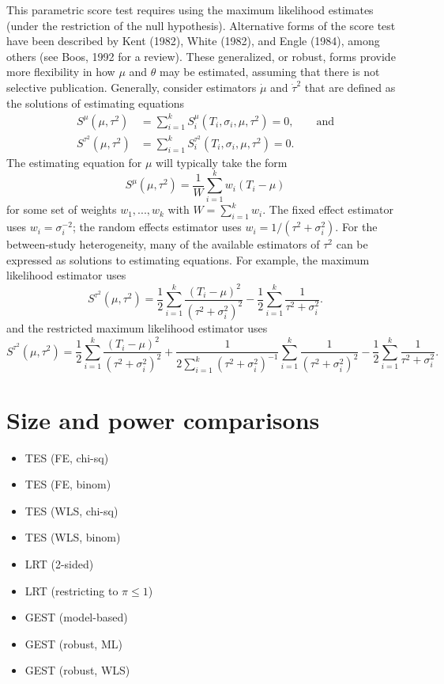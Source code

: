 \documentclass[man,floatsintext]{apa6}
\providecommand{\tightlist}{%
  \setlength{\itemsep}{0pt}\setlength{\parskip}{0pt}}
\begin{document}
This parametric score test requires using the maximum likelihood estimates (under the restriction of the null hypothesis). Alternative forms of the score test have been described by Kent (1982), White (1982), and Engle (1984), among others (see Boos, 1992 for a review).
These generalized, or robust, forms provide more flexibility in how \(\mu\) and \(\theta\) may be estimated, assuming that there is not selective publication.
Generally, consider estimators \(\dot\mu\) and \(\dot\tau^2\) that are defined as the solutions of estimating equations
\[
\begin{aligned}
S^\mu\left(\mu, \tau^2\right) &= \sum_{i=1}^k S^\mu_i \left(T_i, \sigma_i, \mu, \tau^2\right) = 0, \qquad \text{and} \\
S^{\tau^2}\left(\mu, \tau^2\right) &= \sum_{i=1}^k S^{\tau^2}_i \left(T_i, \sigma_i, \mu, \tau^2\right) = 0.
\end{aligned}
\]
The estimating equation for \(\mu\) will typically take the form
\[
S^\mu(\mu, \tau^2) = \frac{1}{W}\sum_{i=1}^k w_i (T_i - \mu)
\]
for some set of weights \(w_1,...,w_k\) with \(W = \sum_{i=1}^k w_i\).
The fixed effect estimator uses \(w_i = \sigma_i^{-2}\); the random effects estimator uses \(w_i = 1 / \left(\tau^2 + \sigma_i^2\right)\).
For the between-study heterogeneity, many of the available estimators of \(\tau^2\) can be expressed as solutions to estimating equations.
For example, the maximum likelihood estimator uses
\[
S^{\tau^2}(\mu,\tau^2) = \frac{1}{2}\sum_{i=1}^k \frac{(T_i - \mu)^2}{\left(\tau^2 + \sigma_i^2\right)^2} - \frac{1}{2}\sum_{i=1}^k \frac{1}{\tau^2 + \sigma_i^2}.
\]
and the restricted maximum likelihood estimator uses
\[
S^{\tau^2}(\mu,\tau^2) = \frac{1}{2}\sum_{i=1}^k \frac{(T_i - \mu)^2}{\left(\tau^2 + \sigma_i^2\right)^2} + \frac{1}{2 \sum_{i=1}^k (\tau^2 + \sigma_i^2)^{-1}} \sum_{i=1}^k \frac{1}{\left(\tau^2 + \sigma_i^2\right)^2} - \frac{1}{2}\sum_{i=1}^k \frac{1}{\tau^2 + \sigma_i^2}.
\]

\hypertarget{simulations}{%
\section{Size and power comparisons}\label{simulations}}

\begin{itemize}
\tightlist
\item
  TES (FE, chi-sq)
\item
  TES (FE, binom)
\item
  TES (WLS, chi-sq)
\item
  TES (WLS, binom)
\item
  LRT (2-sided)
\item
  LRT (restricting to \(\pi \leq 1\))
\item
  GEST (model-based)
\item
  GEST (robust, ML)
\item
  GEST (robust, WLS)
\end{itemize}
\end{document}

